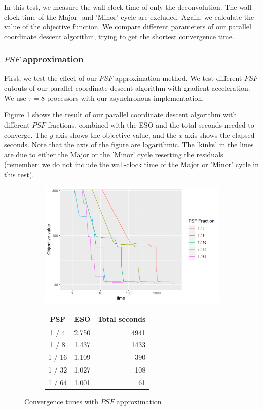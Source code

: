 In this test, we measure the wall-clock time of only the deconvolution. The wall-clock time of the Major- and 'Minor' cycle are excluded. Again, we calculate the value of the objective function. We compare different parameters of our parallel coordinate descent algorithm, trying to get the shortest convergence time.

\subsubsection{$PSF$ approximation}
First, we test the effect of our $PSF$ approximation method. We test different $PSF$ cutouts of our parallel coordinate descent algorithm with gradient acceleration. We use $\tau = 8$ processors with our asynchronous implementation.

Figure \ref{pcdm:results:psf} shows the result of our parallel coordinate descent algorithm with different $PSF$ fractions, combined with the ESO and the total seconds needed to converge. The $y$-axis shows the objective value, and the $x$-axis shows the elapsed seconds. Note that the axis of the figure are logarithmic. The 'kinks' in the lines are due to either the Major or the 'Minor' cycle resetting the residuals (remember: we do not include the wall-clock time of the Major or 'Minor' cycle in this test).

\begin{figure}[h]
	\centering
	\begin{subfigure}{0.6\linewidth}
		\includegraphics[width=1.0\linewidth]{./chapters/05.pcdm/parameters/psfSize.png}
	\end{subfigure}
	\begin{subfigure}{0.35\linewidth}
		\begin{tabular}{c | r | r}
			PSF & ESO & Total seconds \\ \hline
			1 / 4 & 2.750 & 4941 \\
			1 / 8 & 1.437 & 1433 \\
			1 / 16 & 1.109 & 390 \\
			1 / 32 & 1.027 & 108 \\
			1 / 64 & 1.001 & 61 \\
		\end{tabular}
	\end{subfigure}
	\caption{Convergence times with $PSF$ approximation}
	\label{pcdm:results:psf}
\end{figure}

